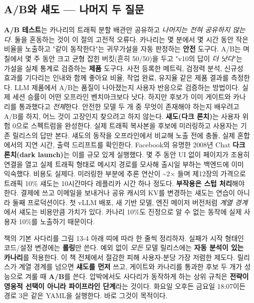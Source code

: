 \subsection*{A/B와 섀도 — 나머지 두 질문}

\textbf{A/B 테스트}는 카나리의 트래픽 분할 배관만 공유하고 \textit{나머지는 전혀 공유하지 않는다.} 둘을 혼동하는 것이 이 절의 고전적 오류다. 카나리는 몇 분에서 몇 시간 동안 작은 비율을 노출하고 "같이 동작한다"는 귀무가설을 자동 판정하는 \textbf{안전} 도구다. A/B는 며칠에서 몇 주 동안 크고 균형 잡힌 버킷(흔히 50/50)을 두고 "v10의 답이 \textit{더 낫다}"는 가설을 실제 통계로 검증하는 \textbf{제품} 도구다. 사전 등록한 메트릭, 검정력 분석, 신규성 효과를 기다리는 인내와 함께 좋아요 비율, 작업 완료, 유지율 같은 제품 결과를 측정한다. LLM 제품에서 A/B는 품질이 나아졌는지 사용자 반응으로 검증하는 방법이다. 실제 세션 승률이 어떤 오프라인 벤치마크보다 낫다. 하지만 후보가 이미 게이트와 카나리를 통과했다고 \textit{전제}한다. 안전한 모델 두 개 중 무엇이 존재해야 하는지 배우려고 A/B를 하지, 어느 것이 고장인지 찾으려고 하지 않는다. \textbf{섀도(다크 론치)}는 사용자 위험 0으로 스펙트럼을 완성한다. 실제 트래픽 복사본을 후보에 미러링하고 사용자는 기존 릴리스의 답만 본다. 섀도의 동작을 오프라인에서 비교해 노출 전에 충돌, 실제 혼합에서의 지연 시간, 출력 드리프트를 확인한다. Facebook의 유명한 2008년 Chat \textbf{다크 론치(dark launch)}는 이를 규모 있게 실행했다. 몇 주 동안 UI 없이 페이지가 조용히 연결을 열고 실제 트래픽 형태로 메시지 경로를 모사해 출시일 부하는 백엔드에 이미 익숙했다. 비용도 실제다. 미러링한 부분에 추론 연산이 \textasciitilde{}2× 들며 제12장의 가격으로 트래픽 10\% 섀도는 10시간마다 레플리카 시간 하나 정도다. \textbf{부작용은 스텁 처리}해야 한다. 결제에 쓰고 이메일을 보내거나 공유 캐시의 KV를 변경하는 섀도는 연습이 아니라 둘째 프로덕션이다. 첫 vLLM 배포, 새 기반 모델, 엔진 메이저 버전처럼 \textit{계열 경계}에서 섀도는 비용만큼 가치가 있다. 카나리 10\%도 진정으로 알 수 없는 동작에 실제 사용자 10\%를 노출하기 때문이다.

책의 기본 사다리를 그림 13-4 아래 띠에 따라 한 줄씩 정리하자. 실패가 시작 형태인 코드/설정 변경에는 \textbf{롤링}만 쓴다. 예외 없이 \textit{모든} 모델 릴리스에는 \textbf{자동 분석이 있는 카나리}를 적용한다. 이 책 전체에서 절감한 피해 사용자-분당 가장 저렴한 제도다. 릴리스가 계열 경계를 넘으면 \textbf{섀도를 먼저} 쓰고, 게이트와 카나리를 통과한 후보 두 개가 성능으로 겨룰 때 \textbf{A/B}를 쓴다. 압박에서도 사다리가 동작하게 하는 상위 규칙은 \textbf{전략이 영웅적 선택이 아니라 파이프라인 단계}라는 것이다. 화요일 오후든 금요일 18:07이든 경로 3은 같은 YAML을 실행한다. 바로 그것이 목적이다.

